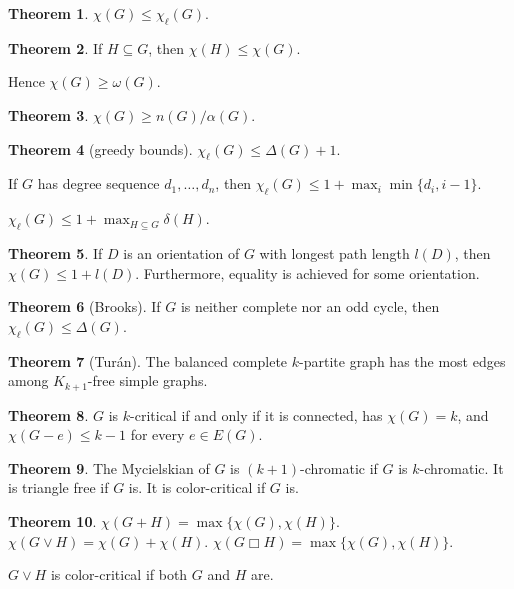 \documentclass{article}
\newcommand{\cp}{\mathbin\Box}
\theoremstyle{definition}
\newtheorem{theorem}{Theorem}
\begin{document}
\thispagestyle{empty}


\begin{theorem}
$\chi(G)\leq \chi_{\ell}(G)$.
\end{theorem}

\begin{theorem}
If $H\subseteq G$, then $\chi(H)\leq \chi(G)$.

Hence $\chi(G)\geq \omega(G)$.
\end{theorem}

\begin{theorem}
$\chi(G)\geq n(G)/\alpha(G)$.
\end{theorem}

\begin{theorem}[greedy bounds]
$\chi_{\ell}(G)\leq \Delta(G)+1$.

If $G$ has degree sequence $d_1, \dotsc, d_n$, then $\chi_{\ell}(G)\leq 1+\max_i \min\{d_i, i-1\}$.

$\chi_{\ell}(G)\leq 1+\max_{H\subseteq G} \delta(H)$.
\end{theorem}

\begin{theorem}
If $D$ is an orientation of $G$ with longest path length $l(D)$, then $\chi(G)\leq 1+l(D)$.  Furthermore, equality is achieved for some orientation.
\end{theorem}

\begin{theorem}[Brooks]
If $G$ is neither complete nor an odd cycle, then $\chi_{\ell}(G)\leq \Delta(G)$.
\end{theorem}

\begin{theorem}[Tur\'an]
The balanced complete $k$-partite graph has the most edges among $K_{k+1}$-free simple graphs.
\end{theorem}

\begin{theorem}
$G$ is $k$-critical if and only if it is connected, has $\chi(G)=k$, and $\chi(G-e)\leq k-1$ for every $e\in E(G)$.
\end{theorem}

\begin{theorem}
The Mycielskian of $G$ is $(k+1)$-chromatic if $G$ is $k$-chromatic.  It is triangle free if $G$ is.  It is color-critical if $G$ is.
\end{theorem}

\begin{theorem}
$\chi(G+H)=\max\{\chi(G),\chi(H)\}$.
$\chi(G\vee H)=\chi(G)+\chi(H)$.
$\chi(G\cp H)=\max\{\chi(G),\chi(H)\}$.

$G\vee H$ is color-critical if both $G$ and $H$ are.
\end{theorem}
\end{document}
